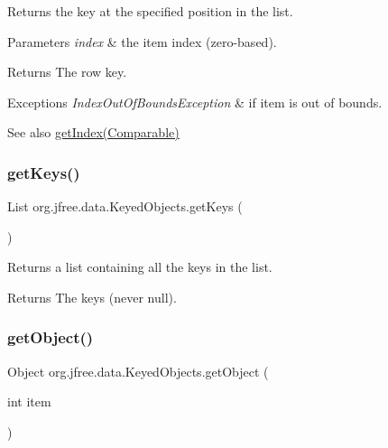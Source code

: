 Returns the key at the specified position in the list.


\begin{DoxyParams}{Parameters}
{\em index} & the item index (zero-\/based).\\
\hline
\end{DoxyParams}
\begin{DoxyReturn}{Returns}
The row key.
\end{DoxyReturn}

\begin{DoxyExceptions}{Exceptions}
{\em Index\+Out\+Of\+Bounds\+Exception} & if {\ttfamily item} is out of bounds.\\
\hline
\end{DoxyExceptions}
\begin{DoxySeeAlso}{See also}
\mbox{\hyperlink{classorg_1_1jfree_1_1data_1_1_keyed_objects_af049dbf079bd3469dea36d9b62db3846}{get\+Index(\+Comparable)}} 
\end{DoxySeeAlso}
\mbox{\label{classorg_1_1jfree_1_1data_1_1_keyed_objects_a454f023a42f3bc6ca0cc6aff5439004d}} 
\subsubsection{\texorpdfstring{get\+Keys()}{getKeys()}}
{\footnotesize\ttfamily List org.\+jfree.\+data.\+Keyed\+Objects.\+get\+Keys (\begin{DoxyParamCaption}{ }\end{DoxyParamCaption})}

Returns a list containing all the keys in the list.

\begin{DoxyReturn}{Returns}
The keys (never {\ttfamily null}). 
\end{DoxyReturn}
\mbox{\label{classorg_1_1jfree_1_1data_1_1_keyed_objects_ac149cd342e93c780dd222b7caf6d1488}} 
\subsubsection{\texorpdfstring{get\+Object()}{getObject()}\hspace{0.1cm}{\footnotesize\ttfamily [1/2]}}
{\footnotesize\ttfamily Object org.\+jfree.\+data.\+Keyed\+Objects.\+get\+Object (\begin{DoxyParamCaption}\item[{int}]{item }\end{DoxyParamCaption})}

